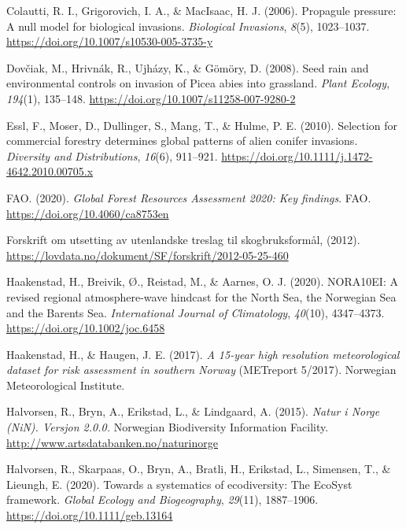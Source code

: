 \documentclass[
]{article}
\newlength{\cslhangindent}
\newenvironment{CSLReferences}[2] %
 {\begin{list}{}{%
  \setlength{\itemindent}{0pt}
  \setlength{\leftmargin}{0pt}
  \setlength{\parsep}{0pt}
  \ifodd #1
   \setlength{\leftmargin}{\cslhangindent}
   \setlength{\itemindent}{-1\cslhangindent}
  \fi
  \setlength{\itemsep}{#2\baselineskip}}}
 {\end{list}}
\begin{document}
\begin{CSLReferences}{1}{0}
Colautti, R. I., Grigorovich, I. A., \& MacIsaac, H. J. (2006). Propagule pressure: A null model for biological invasions. \emph{Biological Invasions}, \emph{8}(5), 1023--1037. \url{https://doi.org/10.1007/s10530-005-3735-y}

Dovčiak, M., Hrivnák, R., Ujházy, K., \& Gömöry, D. (2008). Seed rain and environmental controls on invasion of {Picea} abies into grassland. \emph{Plant Ecology}, \emph{194}(1), 135--148. \url{https://doi.org/10.1007/s11258-007-9280-2}

Essl, F., Moser, D., Dullinger, S., Mang, T., \& Hulme, P. E. (2010). Selection for commercial forestry determines global patterns of alien conifer invasions. \emph{Diversity and Distributions}, \emph{16}(6), 911--921. \url{https://doi.org/10.1111/j.1472-4642.2010.00705.x}

FAO. (2020). \emph{Global {Forest Resources Assessment} 2020: {Key} findings}. {FAO}. \url{https://doi.org/10.4060/ca8753en}

Forskrift om utsetting av utenlandske treslag til skogbruksformål, (2012). \url{https://lovdata.no/dokument/SF/forskrift/2012-05-25-460}

Haakenstad, H., Breivik, Ø., Reistad, M., \& Aarnes, O. J. (2020). {NORA10EI}: {A} revised regional atmosphere-wave hindcast for the {North Sea}, the {Norwegian Sea} and the {Barents Sea}. \emph{International Journal of Climatology}, \emph{40}(10), 4347--4373. \url{https://doi.org/10.1002/joc.6458}

Haakenstad, H., \& Haugen, J. E. (2017). \emph{A 15-year high resolution meteorological dataset for risk assessment in southern {Norway}} (METreport 5/2017). {Norwegian Meteorological Institute}.

Halvorsen, R., Bryn, A., Erikstad, L., \& Lindgaard, A. (2015). \emph{Natur i {Norge} ({NiN}). Versjon 2.0.0.} {Norwegian Biodiversity Information Facility}. \url{http://www.artsdatabanken.no/naturinorge}

Halvorsen, R., Skarpaas, O., Bryn, A., Bratli, H., Erikstad, L., Simensen, T., \& Lieungh, E. (2020). Towards a systematics of ecodiversity: {The EcoSyst} framework. \emph{Global Ecology and Biogeography}, \emph{29}(11), 1887--1906. \url{https://doi.org/10.1111/geb.13164}


\end{CSLReferences}
\end{document}
